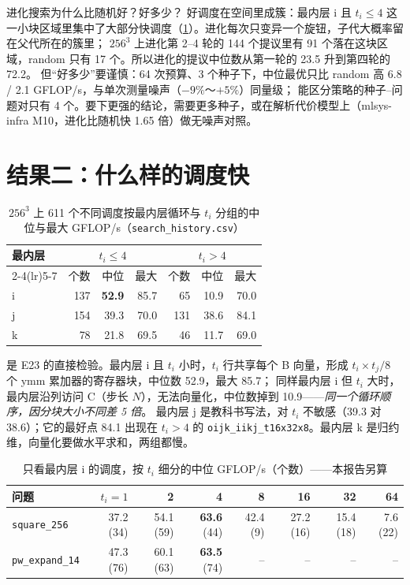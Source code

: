 \documentclass[11pt,a4paper]{ctexart}
\newcommand{\sk}[1]{\texttt{#1}}
\begin{document}
\begin{iqbox}{进化搜索为什么比随机好？好多少？}
好调度在空间里成簇：最内层 i 且 $t_i\le4$ 这一小块区域里集中了大部分快调度（\cref{sec:what}）。进化每次只变异一个旋钮，子代大概率留在父代所在的簇里；
$256^3$ 上进化第 2--4 轮的 144 个提议里有 91 个落在这块区域，random 只有 17 个。所以进化的提议中位数从第一轮的 23.5 升到第四轮的 72.2。
但“好多少”要谨慎：64 次预算、3 个种子下，中位最优只比 random 高 6.8 / 2.1 GFLOP/s，与单次测量噪声（$-9\%$～$+5\%$）同量级；
能区分策略的种子--问题对只有 4 个。要下更强的结论，需要更多种子，或在解析代价模型上（mlsys-infra M10，进化比随机快 1.65 倍）做无噪声对照。
\end{iqbox}

\section{结果二：什么样的调度快}\label{sec:what}

\begin{table}[H]
\centering\small
\caption{$256^3$ 上 611 个不同调度按最内层循环与 $t_i$ 分组的中位与最大 GFLOP/s（\texttt{search\_history.csv}）}\label{tab:inner}
\begin{tabular}{lrrrrrr}
\toprule
最内层 & \multicolumn{3}{c}{$t_i\le4$} & \multicolumn{3}{c}{$t_i>4$} \\
\cmidrule(lr){2-4}\cmidrule(lr){5-7}
 & 个数 & 中位 & 最大 & 个数 & 中位 & 最大 \\
\midrule
i & 137 & \textbf{52.9} & 85.7 & 65 & 10.9 & 70.0 \\
j & 154 & 39.3 & 70.0 & 131 & 38.6 & 84.1 \\
k & 78 & 21.8 & 69.5 & 46 & 11.7 & 69.0 \\
\bottomrule
\end{tabular}
\end{table}

 是 E23 的直接检验。最内层 i 且 $t_i$ 小时，$t_i$ 行共享每个 B 向量，形成 $t_i\times t_j/8$ 个 ymm 累加器的寄存器块，中位数 52.9，最大 85.7；
同样最内层 i 但 $t_i$ 大时，最内层沿列访问 C（步长 $N$），无法向量化，中位数掉到 10.9——\emph{同一个循环顺序，因分块大小不同差 5 倍}。
最内层 j 是教科书写法，对 $t_i$ 不敏感（39.3 对 38.6）；它的最好点 84.1 出现在 $t_i>4$ 的 \sk{oijk\_iikj\_t16x32x8}。最内层 k 是归约维，向量化要做水平求和，两组都慢。

\begin{table}[H]
\centering\small
\caption{只看最内层 i 的调度，按 $t_i$ 细分的中位 GFLOP/s（个数）——本报告另算}\label{tab:innerti}
\begin{tabular}{lrrrrrrr}
\toprule
问题 & $t_i=1$ & 2 & 4 & 8 & 16 & 32 & 64 \\
\midrule
\sk{square\_256} & 37.2 (34) & 54.1 (59) & \textbf{63.6} (44) & 42.4 (9) & 27.2 (16) & 15.4 (18) & 7.6 (22) \\
\sk{pw\_expand\_14} & 47.3 (76) & 60.1 (63) & \textbf{63.5} (74) & -- & -- & -- & -- \\
\bottomrule
\end{tabular}
\end{table}
\end{document}
